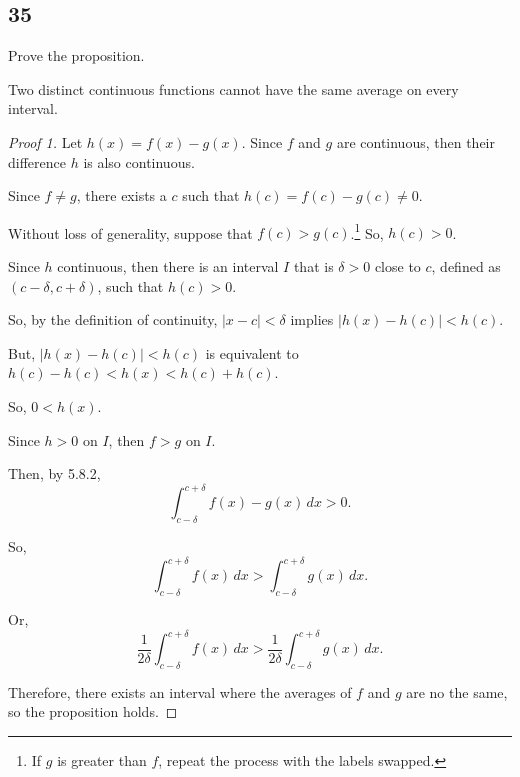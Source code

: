 \documentclass[../hw7.tex]{subfiles}
\begin{document}
\subsection*{35}
Prove the proposition.

\begin{proposition}
    Two distinct continuous functions cannot have the same average on
    every interval.    
\end{proposition}


\begin{proof}[Proof 1]
    Let $h(x)=f(x)-g(x)$. Since $f$ and $g$ are continuous, then their difference $h$ is also continuous.
    
    Since $f\neq g$, there exists a $c$ such that $h(c)=f(c)-g(c)\neq0$.

    Without loss of generality, suppose that $f(c)>g(c)$.\footnote{If $g$ is greater than $f$, repeat the process with the labels swapped.} So, $h(c)>0$.

    Since $h$ continuous, then there is an interval $I$ that is $\delta>0$ close to $c$, defined as $(c-\delta,c+\delta)$, such that $h(c)>0$.

    So, by the definition of continuity, $|x-c|<\delta$ implies $|h(x)-h(c)|<h(c)$.

    But, $|h(x)-h(c)|<h(c)$ is equivalent to $h(c)-h(c)<h(x)<h(c)+h(c)$.

    So, $0<h(x)$.

    Since $h>0$ on $I$, then $f>g$ on $I$.

    Then, by 5.8.2, \[\int_{c-\delta}^{c+\delta} f(x)-g(x)\,dx > 0.\]

    So, \[\int_{c-\delta}^{c+\delta} f(x)\,dx > \int_{c-\delta}^{c+\delta} g(x)\,dx.\]

    Or, \[\frac{1}{2\delta}\int_{c-\delta}^{c+\delta} f(x)\,dx > \frac{1}{2\delta}\int_{c-\delta}^{c+\delta} g(x)\,dx.\]

    Therefore, there exists an interval where the averages of $f$ and $g$ are no the same, so the proposition holds.

\end{proof}
\end{document}
